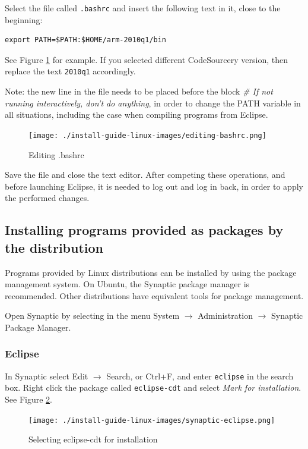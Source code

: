 \documentclass[a4paper, 10pt]{article}
\begin{document}
Select the file called \verb+.bashrc+ and insert the following text in it,
close to the beginning:

\begin{verbatim}
export PATH=$PATH:$HOME/arm-2010q1/bin
\end{verbatim}

See Figure \ref{fig:editing-bashrc} for example. If you selected different CodeSourcery version,
then replace the text \verb+2010q1+ accordingly.

Note: the new line in the file needs to be placed before the block
\emph{\# If not running interactively, don't do anything},
in order to change the PATH variable in all situations,
including the case when compiling programs from Eclipse.

    \begin{figure}[H]
    \centering
        \texttt{[image: ./install-guide-linux-images/editing-bashrc.png]}
        \caption{Editing .bashrc}
        \label{fig:editing-bashrc}
    \end{figure}

Save the file and close the text editor.
After competing these operations, and before launching Eclipse, it is needed to
log out and log in back, in order to apply the performed changes.

\subsection{Installing programs provided as packages by the distribution}

Programs provided by Linux distributions can be installed by using the package management system.
On Ubuntu, the Synaptic package manager is recommended.
Other distributions have equivalent tools for package management.

Open Synaptic by selecting in the menu System $\rightarrow$ Administration $\rightarrow$
Synaptic Package Manager.

\subsubsection{Eclipse}

In Synaptic select Edit $\rightarrow$ Search, or Ctrl+F, and enter \verb+eclipse+
in the search box. Right click the package called
\verb+eclipse-cdt+ and select \emph{Mark for installation}.
See Figure \ref{fig:synaptic-eclipse}.

    \begin{figure}[H]
    \centering
        \texttt{[image: ./install-guide-linux-images/synaptic-eclipse.png]}
        \caption{Selecting eclipse-cdt for installation}
        \label{fig:synaptic-eclipse}
    \end{figure}
\end{document}
